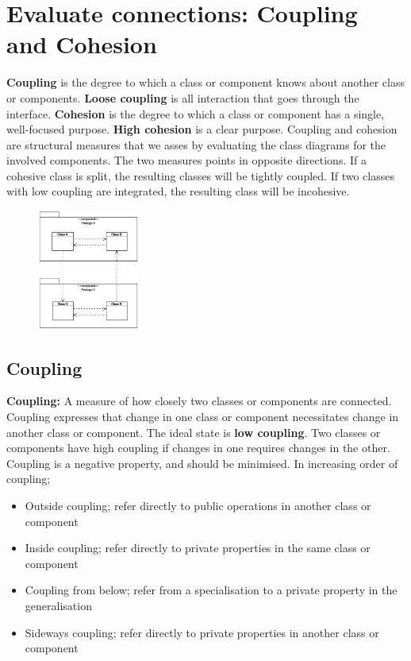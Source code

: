 \section{Evaluate connections: Coupling and Cohesion}
\textbf{Coupling} is the degree to which a class or component knows about another class or components. \textbf{Loose coupling} is all interaction that goes through the interface. \textbf{Cohesion} is the degree to which a class or component has a single, well-focused purpose. \textbf{High cohesion} is a clear purpose. 
Coupling and cohesion are structural measures that we asses by evaluating the class diagrams for the involved components. The two measures points in opposite directions. If a cohesive class is split, the resulting classes will be tightly coupled. If two classes with low coupling are integrated, the resulting class will be incohesive. 
\begin{figure}[H]
    \centering
   \includegraphics[width=0.3\textwidth]{figures/evaluateconnectionsboth.png}
\end{figure}

\subsection{Coupling}
\textbf{Coupling:} A measure of how closely two classes or components are connected. \\
Coupling expresses that change in one class or component necessitates change in another class or component. The ideal state is \textbf{low coupling}. Two classes or components have high coupling if changes in one requires changes in the other. Coupling is a negative property, and should be minimised. In increasing order of coupling;

\begin{itemize}
    \item Outside coupling; refer directly to public operations in another class or component
    \item Inside coupling; refer directly to private properties in the same class or component
    \item Coupling from below; refer from a specialisation to a private property in the generalisation
    \item Sideways coupling; refer directly to private properties in another class or component
\end{itemize}

